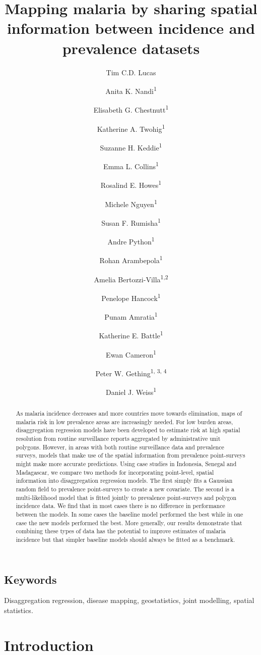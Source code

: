 \documentclass{statsoc}
\title[Mapping malaria by sharing spatial information]{Mapping malaria by sharing spatial information between incidence and prevalence datasets}
\author[Tim C.D. Lucas {\it et al.}]{Tim C.D. Lucas}
\author{Anita K. Nandi\textsuperscript{1}}
\author{Elisabeth G. Chestnutt\textsuperscript{1}}
\author{Katherine A. Twohig\textsuperscript{1}}
\author{Suzanne H. Keddie\textsuperscript{1}}
\author{Emma L. Collins\textsuperscript{1}}
\author{Rosalind E. Howes\textsuperscript{1}}
\author{Michele Nguyen\textsuperscript{1}}
\author{Susan F. Rumisha\textsuperscript{1}}
\author{Andre Python\textsuperscript{1}}
\author{Rohan Arambepola\textsuperscript{1}}
\author{Amelia Bertozzi-Villa\textsuperscript{1,2}}
\author{Penelope Hancock\textsuperscript{1}}
\author{Punam Amratia\textsuperscript{1}}
\author{Katherine E. Battle\textsuperscript{1}}
\author{Ewan Cameron\textsuperscript{1}}
\author{Peter W. Gething\textsuperscript{1, 3, 4}}
\author{Daniel J. Weiss\textsuperscript{1}}
\begin{document}
\begin{abstract}
As malaria incidence decreases and more countries move towards elimination, maps of malaria risk in low prevalence areas are increasingly needed.
For low burden areas, disaggregation regression models have been developed to estimate risk at high spatial resolution from routine surveillance reports aggregated by administrative unit polygons.
However, in areas with both routine surveillance data and prevalence surveys, models that make use of the spatial information from prevalence point-surveys might make more accurate predictions.
Using case studies in Indonesia, Senegal and Madagascar, we compare two methods for incorporating point-level, spatial information into disaggregation regression models.
The first simply fits a Gaussian random field to prevalence point-surveys to create a new covariate.
The second is a multi-likelihood model that is fitted jointly to prevalence point-surveys and polygon incidence data.
We find that in most cases there is no difference in performance between the models.
In some cases the baseline model performed the best while in one case the new models performed the best.
More generally, our results demonstrate that combining these types of data has the potential to improve estimates of malaria incidence but that simpler baseline models should always be fitted as a benchmark.
\end{abstract}

\subsection{Keywords}
Disaggregation regression, disease mapping, geostatistics, joint modelling, spatial statistics.


\section*{Introduction}


\end{document}
